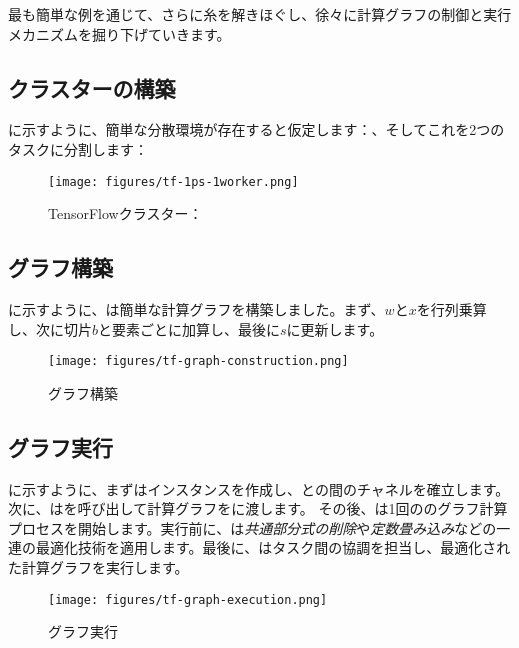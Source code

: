 \begin{content}

最も簡単な例を通じて、さらに糸を解きほぐし、徐々に\tf{}計算グラフの制御と実行メカニズムを掘り下げていきます。

\subsection{クラスターの構築}

に示すように、簡単な分散環境が存在すると仮定します：、そしてこれを2つのタスクに分割します：

\begin{enum}
\end{enum}

\begin{figure}[!htbp]
\centering
\texttt{[image: figures/tf-1ps-1worker.png]}
\caption{TensorFlowクラスター：}
 \label{fig:tf-1ps-1worker}
\end{figure}

\subsection{グラフ構築}

に示すように、は簡単な計算グラフを構築しました。まず、$w$と$x$を行列乗算し、次に切片$b$と要素ごとに加算し、最後に$s$に更新します。

\begin{figure}[!htbp]
\centering
\texttt{[image: figures/tf-graph-construction.png]}
\caption{グラフ構築}
 \label{fig:tf-graph-construction}
\end{figure}

\subsection{グラフ実行}
に示すように、まずはインスタンスを作成し、との間のチャネルを確立します。次に、はを呼び出して計算グラフをに渡します。
その後、は1回ののグラフ計算プロセスを開始します。実行前に、は\emph{共通部分式の削除}や\emph{定数畳み込み}などの一連の最適化技術を適用します。最後に、はタスク間の協調を担当し、最適化された計算グラフを実行します。
\begin{figure}[!htbp]
\centering
\texttt{[image: figures/tf-graph-execution.png]}
\caption{グラフ実行}
\label{fig:tf-graph-execution}
\end{figure}

\end{content}
